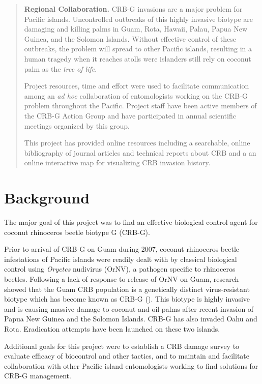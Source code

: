 \documentclass[12pt,
letterpaper,english,bibliography=totocnumbered, abstract=on]{scrartcl}
\begin{document}
\begin{abstract}
	\textbf{Regional Collaboration.} CRB-G invasions are a major problem for Pacific islands. Uncontrolled outbreaks of this highly invasive biotype are damaging and killing palms in Guam, Rota, Hawaii, Palau, Papua New Guinea, and the Solomon Islands. Without effective control of these outbreaks, the problem will spread to other Pacific islands, resulting in a human tragedy when it reaches atolls were islanders still rely on coconut palm as the \textit{tree of life}. 
	
	Project resources, time and effort were used to facilitate communication among an \textit{ad hoc} collaboration of entomologists working on the CRB-G problem throughout the Pacific. Project staff have been active members of the CRB-G Action Group and have participated in annual scientific meetings organized by this group.
	
	This project has provided online resources including a searchable, online bibliography of journal articles and technical reports about CRB and a an online interactive map for visualizing CRB invasion history.

\end{abstract}


\newpage
\tableofcontents{}

\newpage

\section{Background}

The major goal of this project was to find an effective biological
control agent for coconut rhinoceros beetle biotype G (CRB-G).

Prior to arrival of CRB-G on Guam during 2007, coconut rhinoceros beetle
infestations of Pacific islands were readily dealt with by classical
biological control using \textit{Oryctes} nudivirus (OrNV), a pathogen specific to rhinoceros beetles. 
Following a lack
of response to release of OrNV on Guam, research showed that the Guam
CRB population is a genetically distinct virus-resistant biotype which
has become known as CRB-G (\cite{marshall_new_2017-1}). This biotype is highly invasive and is
causing massive damage to coconut and oil palms after recent invasion of Papua New Guinea
and the Solomon Islands. CRB-G has also invaded Oahu and Rota. Eradication
attempts have been launched on these two islands.

Additional goals for this project were to establish a CRB damage survey to evaluate efficacy of biocontrol and other tactics, and to maintain and facilitate collaboration with other Pacific island entomologists working to find solutions for CRB-G management.
\end{document}
